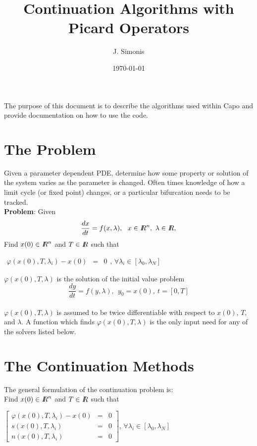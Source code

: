 \documentclass[11pt]{article}
\def\RR{\it I\hskip-3.9pt R}
\def\Rn{{\RR}^n}
\begin{document}
\title{Continuation Algorithms with Picard Operators}
\author{J. Simonis}\date{\today}\maketitle

The purpose of this document is to describe the algorithms used within Capo
and provide documentation on how to use the code.
\section{The Problem}
Given a parameter 
dependent PDE, determine how some property or solution of the system  varies as the parameter is changed.  Often times knowledge of how a limit cycle (or
fixed point) changes, or a particular bifurcation needs to be tracked.\\
\textbf{Problem}: Given
\begin{equation}
\frac{dx}{dt}=f(x,\lambda),\ \ x\in\Rn,\ \lambda\in\RR, 
\end{equation}
Find $x(0)\in\Rn$ and $T\in\RR$ such that 
\begin{center}
$\begin{array}{ccc}
\varphi(x(0),T,\lambda_i)-x(0)&=&0
\end{array}$,
$\forall \lambda_i \in [\lambda_0,\lambda_N]$
\end{center}

$\varphi(x(0),T,\lambda)$ is the solution of the initial value problem
\begin{equation}
\frac{dy}{dt}=f(y,\lambda),\ \ y_0=x(0),\ t=[0,T] 
\end{equation}\\
$\varphi(x(0),T,\lambda)$ is assumed 
to be twice differentiable with 
respect to $x(0)$, $T$, and $\lambda$.  A function which
finds $\varphi(x(0),T,\lambda)$ is the only input need
for any of the solvers listed below.




\section{The Continuation Methods}
The general formulation of the continuation problem is:\\
Find $x(0)\in\Rn$ and $T\in\RR$ such that 
\begin{center}
$\left[
\begin{array}{ccc}
\varphi(x(0),T,\lambda_i)-x(0)&=&0\\
s(x(0),T,\lambda_i)&=&0\\
n(x(0),T,\lambda_i)&=&0
\end{array}\right]
$,
$\forall \lambda_i \in [\lambda_0,\lambda_N]$
\end{center}
\end{document}
